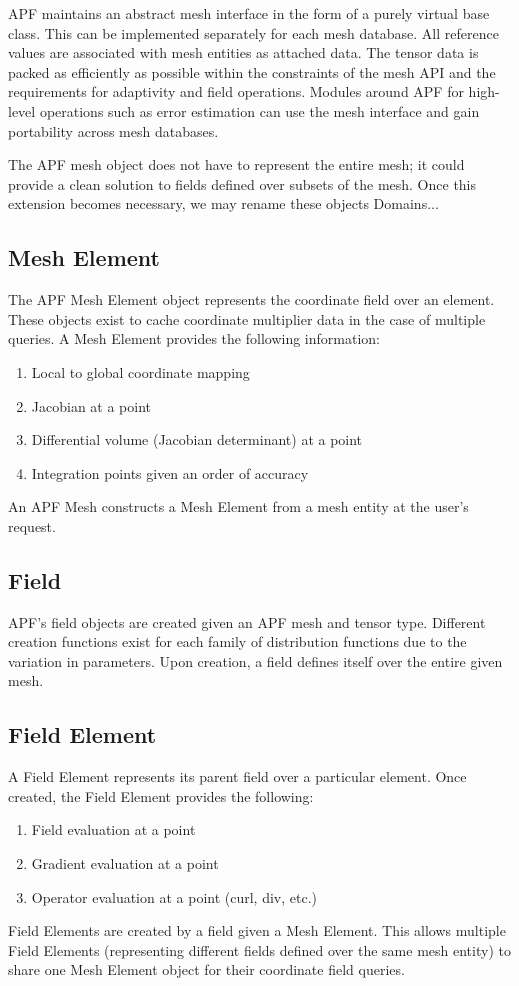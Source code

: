 \documentclass{article}
\begin{document}
APF maintains an abstract mesh interface in the form of a purely virtual base class.
This can be implemented separately for each mesh database.
All reference values are associated with mesh entities as attached data.
The tensor data is packed as efficiently as possible within the constraints of the
mesh API and the requirements for adaptivity and field operations.
Modules around APF for high-level operations such as error estimation
can use the mesh interface and gain portability across mesh databases.

The APF mesh object does not have to represent the entire mesh; it could provide
a clean solution to fields defined over subsets of the mesh.
Once this extension becomes necessary, we may rename these objects
Domains...

\subsection{Mesh Element}

The APF Mesh Element object represents the coordinate
field over an element.
These objects exist to cache coordinate multiplier data in the case
of multiple queries.
A Mesh Element provides the following information:
\begin{enumerate}
\item Local to global coordinate mapping
\item Jacobian at a point
\item Differential volume (Jacobian determinant) at a point
\item Integration points given an order of accuracy
\end{enumerate}
An APF Mesh constructs a Mesh Element from a mesh entity
at the user's request.

\subsection{Field}

APF's field objects are created given an APF mesh and tensor type.
Different creation functions exist for each family of distribution functions
due to the variation in parameters.
Upon creation, a field defines itself over the entire given mesh.

\subsection{Field Element}

A Field Element represents its parent field over a particular element.
Once created, the Field Element provides the following:
\begin{enumerate}
\item Field evaluation at a point
\item Gradient evaluation at a point
\item Operator evaluation at a point (curl, div, etc.)
\end{enumerate}
Field Elements are created by a field given a Mesh Element.
This allows multiple Field Elements (representing different fields
defined over the same mesh entity) to share one Mesh Element
object for their coordinate field queries.
\end{document}
